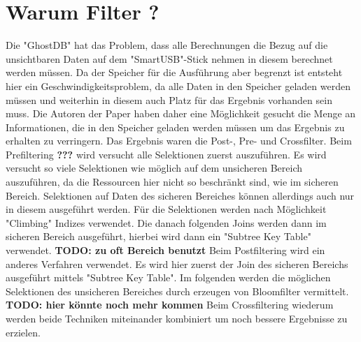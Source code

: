 \chapter{Warum Filter ?}
Die "GhostDB" hat das Problem, dass alle Berechnungen die Bezug auf die unsichtbaren Daten auf dem "SmartUSB"-Stick nehmen in diesem berechnet werden müssen. Da der Speicher für die Ausführung aber begrenzt ist entsteht hier ein Geschwindigkeitsproblem, da alle Daten in den Speicher geladen werden müssen und weiterhin in diesem auch Platz für das Ergebnis vorhanden sein muss. Die Autoren der Paper haben daher eine Möglichkeit gesucht die Menge an Informationen, die in den Speicher geladen werden müssen um das Ergebnis zu erhalten zu verringern. Das Ergebnis waren die Post-, Pre- und Crossfilter. Beim Prefiltering \textbf{???} wird versucht alle Selektionen zuerst auszuführen.
Es wird versucht so viele Selektionen wie möglich auf dem unsicheren Bereich auszuführen, da die Ressourcen hier nicht so beschränkt sind, wie im sicheren Bereich. Selektionen auf Daten des sicheren Bereiches können allerdings auch nur in diesem ausgeführt werden. Für die Selektionen werden nach Möglichkeit "Climbing" Indizes verwendet.
Die danach folgenden Joins werden dann im sicheren Bereich ausgeführt, hierbei wird dann ein "Subtree Key Table" verwendet.
\textbf{TODO: zu oft Bereich benutzt}
Beim Postfiltering wird ein anderes Verfahren verwendet. Es wird hier zuerst der Join des sicheren Bereichs ausgeführt mittels "Subtree Key Table". Im folgenden werden die möglichen Selektionen des unsicheren Bereiches durch erzeugen von Bloomfilter vermittelt.
\textbf{TODO: hier könnte noch mehr kommen}
Beim Crossfiltering wiederum werden beide Techniken miteinander kombiniert um noch bessere Ergebnisse zu erzielen.